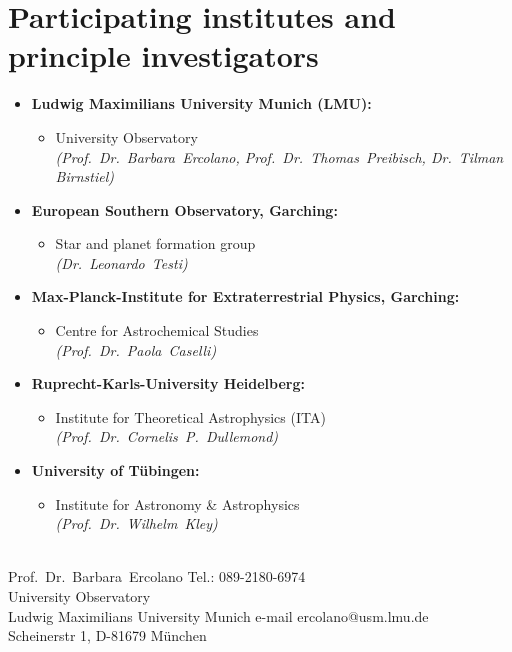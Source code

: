 \documentclass[10pt,fleqn,twoside]{article}
\begin{document}
\section{Participating institutes and 
principle investigators
}\label{app-institutes}
\begin{itemize}
\item {\bf Ludwig Maximilians University Munich (LMU):}
 \begin{itemize}
  \item University Observatory\\    
         {\em (Prof.~Dr.~Barbara~Ercolano, Prof.~Dr.~Thomas~Preibisch,
           Dr.~Tilman Birnstiel)}
  \end{itemize} 
\item {\bf European Southern Observatory, Garching:}
 \begin{itemize} 
\item Star and planet formation group \\
         {\em (Dr.~Leonardo~Testi)}
\end{itemize}
\item {\bf Max-Planck-Institute for Extraterrestrial Physics, Garching:}
 \begin{itemize} 
\item Centre for Astrochemical Studies \\
         {\em (Prof.~Dr.~Paola~Caselli)}
\end{itemize}
\item {\bf Ruprecht-Karls-University Heidelberg:}
\begin{itemize}
 \item Institute for Theoretical Astrophysics (ITA)\\
         {\em (Prof.~Dr.~Cornelis~P.~Dullemond)}
\end{itemize}
\item {\bf University of T\"ubingen:}
\begin{itemize}
  \item Institute for Astronomy \& Astrophysics\\
         {\em (Prof.~Dr.~Wilhelm~Kley)}
\end{itemize}
\end{itemize}
%
\vfill

\\
Prof.~Dr.~Barbara~Ercolano \hfill Tel.: 089-2180-6974\\
University Observatory  \\
Ludwig Maximilians University Munich \hfill e-mail ercolano@usm.lmu.de\\
Scheinerstr 1, D-81679 M\"unchen\\
\end{document}
